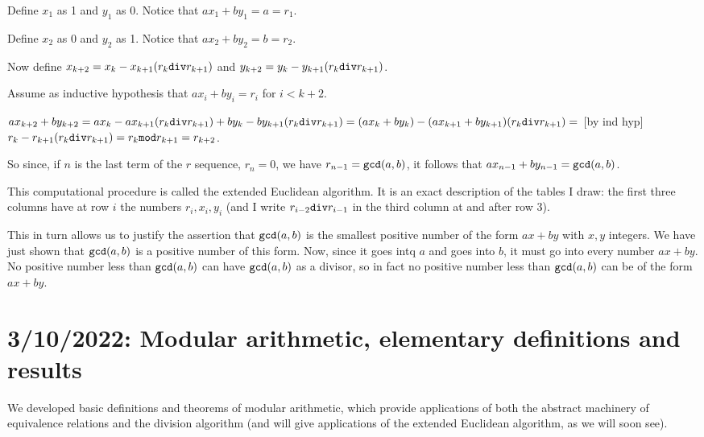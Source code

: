 \documentclass[12pt]{article}
\begin{document}
Define $x_1$ as 1 and $y_1$ as 0.  Notice that $ax_1 +by_1=a=r_1$.

Define $x_2$ as 0 and $y_2$ as 1.  Notice that $ax_2 + by_2 = b = r_2$.

Now define $x_{k+2} = x_k - x_{k+1}(r_k{\tt div}r_{k+1})$ and $y_{k+2} = y_k - y_{k+1}(r_k{\tt div}r_{k+1})$.

Assume as inductive hypothesis that $ax_i + by_i = r_i$ for $i<k+2$.

$ax_{k+2} + by_{k+2} = ax_k - ax_{k+1}(r_k{\tt div}r_{k+1}) +by_k - by_{k+1}(r_k{\tt div}r_{k+1}) =
(ax_k + by_k) - (ax_{k+1}+by_{k+1})(r_k{\tt div}r_{k+1}) = $  [by ind hyp] $r_k - r_{k+1}(r_k{\tt div}r_{k+1})  = r_k{\tt mod}r_{k+1} = r_{k+2}$.

So since, if $n$ is the last term of the $r$ sequence, $r_n=0$, we have $r_{n-1} = {\tt gcd}(a,b)$, it follows
that $ax_{n-1}+by_{n-1}={\tt gcd}(a,b)$.

This computational procedure is called the extended Euclidean algorithm.  It is an exact description of the tables I draw:  the first three columns have at row $i$ the numbers $r_i, x_i, y_i$ (and I write $r_{i-2}{\tt div}r_{i-1}$ in the third column at and after row 3).

This in turn allows us to justify the assertion that ${\tt gcd}(a,b)$ is the smallest positive number of the form $ax+by$ with $x,y$ integers.  We have just shown that ${\tt gcd}(a,b)$ is a positive number of this form.  Now, since it goes intq $a$ and goes into $b$, it must go into every number $ax+by$.  No positive number less than ${\tt gcd}(a,b)$ can have ${\tt gcd}(a,b)$ as a divisor, so in fact no positive number less than ${\tt gcd}(a,b)$ can be of the form $ax+by$.

\section{3/10/2022:  Modular arithmetic, elementary definitions and results}

We developed basic definitions and theorems of modular arithmetic, which provide applications of both the abstract machinery of equivalence relations and the division algorithm (and will give applications of the extended Euclidean algorithm, as we will soon see).
\end{document}
